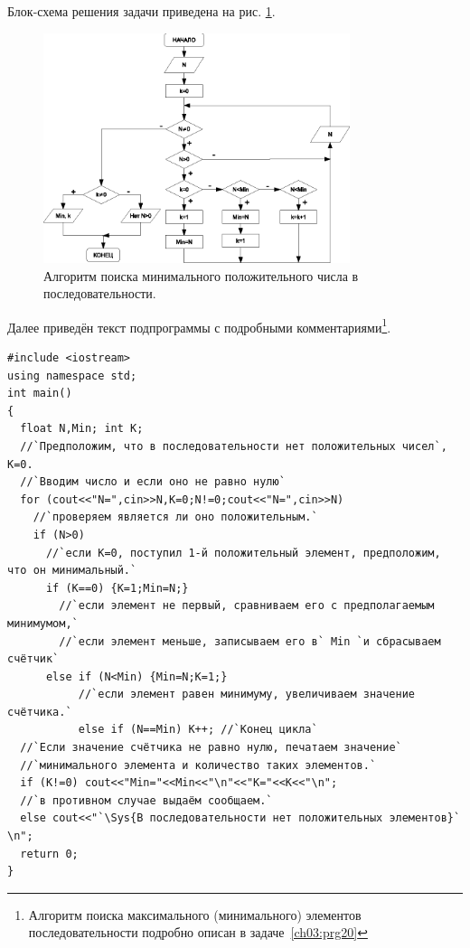 Блок-схема решения задачи приведена на рис. \ref{ch03:refDrawing34}.
\begin{figure}[htb]
\begin{center}
\includegraphics[width=0.8\textwidth]{img/ris_3_35}
\caption{Алгоритм поиска минимального положительного числа в последовательности.}
\label{ch03:refDrawing34}
\end{center}
\end{figure}

Далее приведён текст подпрограммы с подробными комментариями\footnote{Алгоритм поиска максимального (минимального)
элементов последовательности подробно описан в задаче~\ref{ch03:prg20}}.

\begin{lstlisting}
#include <iostream>
using namespace std;
int main()
{
  float N,Min; int K;
  //`Предположим, что в последовательности нет положительных чисел`, K=0.
  //`Вводим число и если оно не равно нулю`
  for (cout<<"N=",cin>>N,K=0;N!=0;cout<<"N=",cin>>N)
    //`проверяем является ли оно положительным.`
    if (N>0)
      //`если K=0, поступил 1-й положительный элемент, предположим, что он минимальный.`
      if (K==0) {K=1;Min=N;}
        //`если элемент не первый, сравниваем его с предполагаемым минимумом,`
        //`если элемент меньше, записываем его в` Min `и сбрасываем счётчик`
      else if (N<Min) {Min=N;K=1;}
           //`если элемент равен минимуму, увеличиваем значение счётчика.`
           else if (N==Min) K++; //`Конец цикла`
  //`Если значение счётчика не равно нулю, печатаем значение`
  //`минимального элемента и количество таких элементов.`
  if (K!=0) cout<<"Min="<<Min<<"\n"<<"K="<<K<<"\n";
  //`в противном случае выдаём сообщаем.`
  else cout<<"`\Sys{В последовательности нет положительных элементов}` \n";
  return 0;
}
\end{lstlisting}


